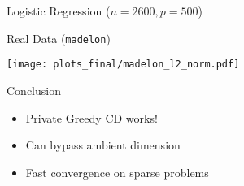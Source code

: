 \documentclass{beamer}
\begin{document}





\begin{frame}
  \begin{center}
    Logistic Regression ($n=2600, p=500$)

    Real Data (\texttt{madelon})

    \texttt{[image: plots\_final/madelon\_l2\_norm.pdf]}
  \end{center}
\end{frame}

\begin{frame}
  {
    \begin{center}
      \Huge Conclusion
    \end{center}
  }

  \LARGE
  \begin{itemize}
  \item Private Greedy CD works!
  \item Can bypass ambient dimension
  \item Fast convergence on sparse problems
  \end{itemize}

\end{frame}


\end{document}
